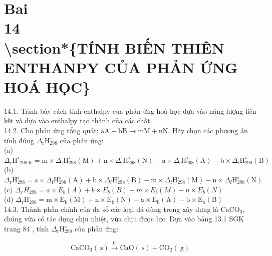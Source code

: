 \documentclass[10pt]{article}
\begin{document}
\section*{Bai \\
 14 \\
 \textbackslash section*\{TÍNH BIẾN THIÊN ENTHANPY CỦA PHẢN ỨNG HOÁ HỌC\}}
14.1. Trình bày cách tính enthalpy của phản ứng hoá học dựa vào năng lượng liên kết và dựa vào enthalpy tạo thành của các chất.\\
14.2. Cho phản ứng tổng quát: $\mathrm{aA}+\mathrm{bB} \rightarrow \mathrm{mM}+\mathrm{nN}$. Hãy chọn các phương án tính đúng $\Delta_{\mathrm{r}} \mathrm{H}_{298}^{\circ}$ của phản ứng:\\
(a) $\Delta_{\mathrm{r}} \mathrm{H}^{\circ}{ }_{298 \mathrm{~K}}=\mathrm{m} \times \Delta_{\mathrm{f}} \mathrm{H}_{298}^{\circ}(\mathrm{M})+\mathrm{n} \times \Delta_{\mathrm{f}} \mathrm{H}_{298}^{\circ}(\mathrm{N})-\mathrm{a} \times \Delta_{\mathrm{f}} \mathrm{H}_{298}^{\circ}(\mathrm{A})-\mathrm{b} \times \Delta_{\mathrm{f}} \mathrm{H}_{298}^{\circ}(\mathrm{B})$\\
(b) $\Delta_{\mathrm{r}} \mathrm{H}_{298}^{\circ}=\mathrm{a} \times \Delta_{\mathrm{f}} \mathrm{H}_{298}^{\circ}(\mathrm{A})+\mathrm{b} \times \Delta_{\mathrm{f}} \mathrm{H}_{298}^{\circ}(\mathrm{B})-\mathrm{m} \times \Delta_{\mathrm{f}} \mathrm{H}_{298}^{\circ}(\mathrm{M})-\mathrm{n} \times \Delta_{\mathrm{f}} \mathrm{H}_{298}^{\circ}(\mathrm{N})$\\
(c) $\Delta_{r} H_{298}^{\circ}=a \times E_{b}(A)+b \times E_{b}(B)-m \times E_{b}(M)-n \times E_{b}(N)$\\
(d) $\Delta_{\mathrm{r}} \mathrm{H}_{298}^{\circ}=\mathrm{m} \times \mathrm{E}_{\mathrm{b}}(\mathrm{M})+\mathrm{n} \times \mathrm{E}_{\mathrm{b}}(\mathrm{N})-\mathrm{a} \times \mathrm{E}_{\mathrm{b}}(\mathrm{A})-\mathrm{b} \times \mathrm{E}_{\mathrm{b}}(\mathrm{B})$\\
14.3. Thành phần chính của đa số các loại đá dùng trong xây dựng là $\mathrm{CaCO}_{3}$, chúng vừa có tác dụng chịu nhiệt, vừa chịu được lực. Dựa vào bảng 13.1 SGK trang 84 , tính $\Delta_{\mathrm{r}} \mathrm{H}_{298}^{\circ}$ của phản ứng:

$$
\mathrm{CaCO}_{3}(\mathrm{~s}) \xrightarrow{\mathrm{t}^{\circ}} \mathrm{CaO}(\mathrm{~s})+\mathrm{CO}_{2}(\mathrm{~g})
$$
\end{document}
